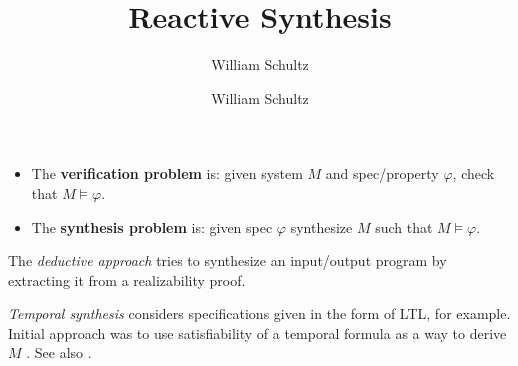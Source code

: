 \documentclass[10pt,a4paper]{article}
\author{William Schultz}
\begin{document}
\title{Reactive Synthesis}
\author{William Schultz}
\maketitle


\begin{itemize}
    \item The \textbf{verification problem} is: given system $M$ and spec/property $\varphi$, check that $M \vDash \varphi$.
    \item The \textbf{synthesis problem} is: given spec $\varphi$ synthesize $M$ such that $M \vDash \varphi$.
\end{itemize}
The \textit{deductive approach} \cite{manna1980deductive} tries to synthesize an input/output program by extracting it from a realizability proof.

\textit{Temporal synthesis} considers specifications given in the form of LTL, for example. Initial approach was to use satisfiability of a temporal formula as a way to derive $M$ \cite{1981clarkemerson}. 
See also \cite{1984mannawolper}.

% 
 

\end{document}
